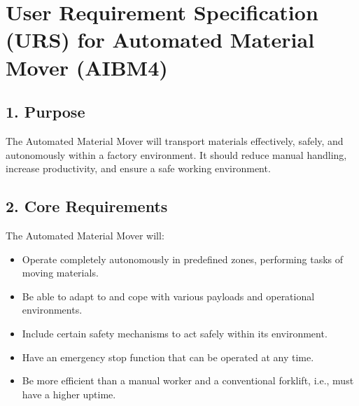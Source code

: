 \documentclass[12pt]{article}
\begin{document}
\section{User Requirement Specification (URS) for Automated Material Mover (AIBM4)}

\subsection{1. Purpose}
The Automated Material Mover will transport materials effectively, safely, and autonomously within a factory environment. It should reduce manual handling, increase productivity, and ensure a safe working environment.

\subsection{2. Core Requirements}
The Automated Material Mover will:
\begin{itemize}
    \item Operate completely autonomously in predefined zones, performing tasks of moving materials.
    \item Be able to adapt to and cope with various payloads and operational environments.
    \item Include certain safety mechanisms to act safely within its environment.
    \item Have an emergency stop function that can be operated at any time.
    \item Be more efficient than a manual worker and a conventional forklift, i.e., must have a higher uptime.
\end{itemize}
\end{document}
